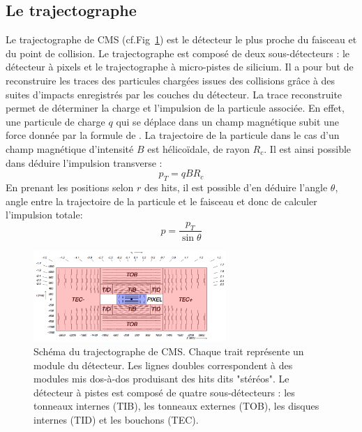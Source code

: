 \subsection{Le trajectographe}
Le trajectographe de CMS (cf.Fig~\ref{trajectographe}) est le détecteur le plus proche du faisceau et du point de collision. Le trajectographe est composé de deux sous-détecteurs : le détecteur à pixels et le trajectographe à micro-pistes de silicium. Il a pour but de reconstruire les traces des particules chargées issues des collisions grâce à des suites d'impacts enregistrés par les couches du détecteur. La trace reconstruite permet de déterminer la charge et l'impulsion de la particule associée. En effet, une particule de charge $q$ qui se déplace dans un champ magnétique subit une force donnée par la formule de . La trajectoire de la particule dans le cas d'un champ magnétique d'intensité $B$ est hélicoïdale, de rayon $R_{c}$. Il est ainsi possible dans déduire l'impulsion transverse :
\begin{equation}
p_{T}=qBR_{c}
\end{equation}
En prenant les positions selon $r$ des hits, il est possible d'en déduire l'angle $\theta$, angle entre la trajectoire de la particule et le faisceau et donc de calculer l'impulsion totale:
\begin{equation}
p=\frac{p_{T}}{\sin\theta}
\end{equation}
\begin{figure}[ht!]
	\centering
	\includegraphics[width=0.65\textwidth]{CMS/tracker.png}
	\captionsetup{type=figure}\caption{Schéma du trajectographe de CMS. Chaque trait représente un module du détecteur. Les lignes doubles correspondent à des modules mis dos-à-dos produisant des hits dits "stéréos". Le détecteur à pistes est composé de quatre sous-détecteurs : les tonneaux internes (TIB), les tonneaux externes (TOB), les disques internes (TID) et les bouchons (TEC).}
	\label{trajectographe}
\end{figure}

